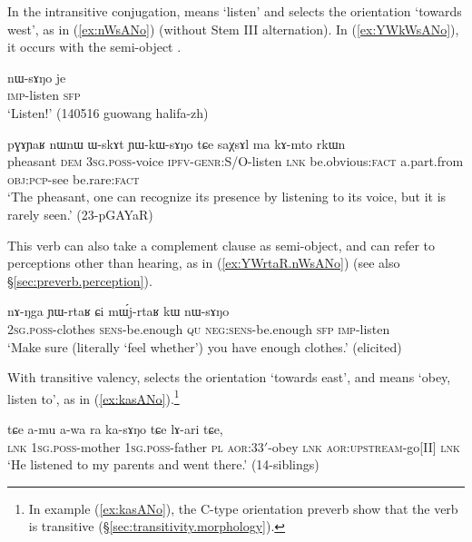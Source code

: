 In the intransitive conjugation,  means `listen' and selects the orientation `towards west', as in (\ref{ex:nWsANo}) (without Stem III alternation). In (\ref{ex:YWkWsANo}), it occurs with the semi-object .

 \begin{exe}
\ex \label{ex:nWsANo}
\gll    nɯ-sɤŋo je  \\
 \textsc{imp}-listen \textsc{sfp} \\
\glt `Listen!' (140516 guowang halifa-zh) 
\end{exe}

\begin{exe}
\ex \label{ex:YWkWsANo}
\gll pɣɤɲaʁ nɯnɯ ɯ-skɤt ɲɯ-kɯ-sɤŋo tɕe saχsɤl ma kɤ-mto rkɯn   \\ 
pheasant \textsc{dem} \textsc{3sg}.\textsc{poss}-voice \textsc{ipfv}-\textsc{genr}:\textsc{S/O}-listen \textsc{lnk} be.obvious:\textsc{fact} a.part.from \textsc{obj}:\textsc{pcp}-see be.rare:\textsc{fact} \\
 \glt `The pheasant, one can recognize its presence by listening to its voice, but it is rarely seen.'   (23-pGAYaR)
\end{exe} 

This verb can also take a complement clause as semi-object, and can refer to perceptions other than hearing, as in (\ref{ex:YWrtaR.nWsANo}) (see also §\ref{sec:preverb.perception}).


\begin{exe}
\ex \label{ex:YWrtaR.nWsANo}
\gll nɤ-ŋga ɲɯ-rtaʁ ɕi mɯ́j-rtaʁ kɯ nɯ-sɤŋo\\
\textsc{2sg}.\textsc{poss}-clothes \textsc{sens}-be.enough \textsc{qu} \textsc{neg}:\textsc{sens}-be.enough \textsc{sfp} \textsc{imp}-listen\\
\glt  `Make sure (literally `feel whether') you have enough clothes.' (elicited)
\end{exe}  

With transitive valency,  selects the orientation `towards east', and means `obey, listen to', as in (\ref{ex:kasANo}).\footnote{In example (\ref{ex:kasANo}), the C-type orientation preverb show that the verb is transitive (§\ref{sec:transitivity.morphology}).}

\begin{exe}
\ex \label{ex:kasANo}
\gll  tɕe a-mu a-wa ra ka-sɤŋo tɕe lɤ-ari tɕe, 	 \\
\textsc{lnk} \textsc{1sg}.\textsc{poss}-mother \textsc{1sg}.\textsc{poss}-father \textsc{pl} \textsc{aor}:3\fl{}3$'$-obey \textsc{lnk}  \textsc{aor}:\textsc{upstream}-go[II] \textsc{lnk}\\
 \glt `He listened to my parents and went there.' (14-siblings)
\end{exe}  

